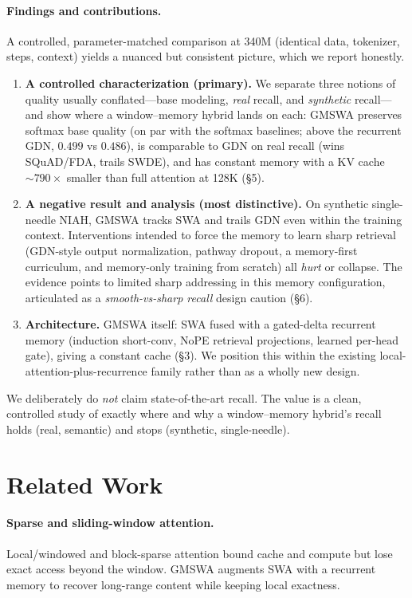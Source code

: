 \documentclass[letterpaper]{article} %
\begin{document}
\paragraph{Findings and contributions.}
A controlled, parameter-matched comparison at 340M (identical data, tokenizer, steps, context) yields a nuanced but consistent picture, which we report honestly.
\begin{enumerate}
\item \textbf{A controlled characterization (primary).} We separate three notions of quality usually conflated---base modeling, \emph{real} recall, and \emph{synthetic} recall---and show where a window--memory hybrid lands on each: GMSWA preserves softmax base quality (on par with the softmax baselines; above the recurrent GDN, $0.499$ vs $0.486$), is comparable to GDN on real recall (wins SQuAD/FDA, trails SWDE), and has constant memory with a KV cache ${\sim}790\times$ smaller than full attention at 128K (\S5).
\item \textbf{A negative result and analysis (most distinctive).} On synthetic single-needle NIAH, GMSWA tracks SWA and trails GDN even within the training context. Interventions intended to force the memory to learn sharp retrieval (GDN-style output normalization, pathway dropout, a memory-first curriculum, and memory-only training from scratch) all \emph{hurt} or collapse. The evidence points to limited sharp addressing in this memory configuration, articulated as a \emph{smooth-vs-sharp recall} design caution (\S6).
\item \textbf{Architecture.} GMSWA itself: SWA fused with a gated-delta recurrent memory (induction short-conv, NoPE retrieval projections, learned per-head gate), giving a constant cache (\S3). We position this within the existing local-attention-plus-recurrence family rather than as a wholly new design.
\end{enumerate}
We deliberately do \emph{not} claim state-of-the-art recall. The value is a clean, controlled study of exactly where and why a window--memory hybrid's recall holds (real, semantic) and stops (synthetic, single-needle).

\section{Related Work}

\paragraph{Sparse and sliding-window attention.}
Local/windowed and block-sparse attention \citep{beltagy2020longformer,zaheer2020bigbird,jiang2023mistral} bound cache and compute but lose exact access beyond the window. GMSWA augments SWA with a recurrent memory to recover long-range content while keeping local exactness.
\end{document}
